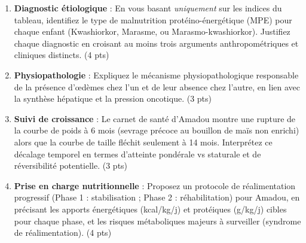 \documentclass[11pt]{article}
\begin{document}
\begin{exercice}
\begin{enumerate}
    \item \textbf{Diagnostic étiologique} : En vous basant \textit{uniquement} sur les indices du tableau, identifiez le type de malnutrition protéino-énergétique (MPE) pour chaque enfant (Kwashiorkor, Marasme, ou Marasmo-kwashiorkor). Justifiez chaque diagnostic en croisant au moins trois arguments anthropométriques et cliniques distincts. \hfill (4 pts)
    \item \textbf{Physiopathologie} : Expliquez le mécanisme physiopathologique responsable de la présence d'œdèmes chez l'un et de leur absence chez l'autre, en lien avec la synthèse hépatique et la pression oncotique. \hfill (3 pts)
    \item \textbf{Suivi de croissance} : Le carnet de santé d'Amadou montre une rupture de la courbe de poids à 6 mois (sevrage précoce au bouillon de maïs non enrichi) alors que la courbe de taille fléchit seulement à 14 mois. Interprétez ce décalage temporel en termes d'atteinte pondérale vs staturale et de réversibilité potentielle. \hfill (3 pts)
    \item \textbf{Prise en charge nutritionnelle} : Proposez un protocole de réalimentation progressif (Phase 1 : stabilisation ; Phase 2 : réhabilitation) pour Amadou, en précisant les apports énergétiques (kcal/kg/j) et protéiques (g/kg/j) cibles pour chaque phase, et les risques métaboliques majeurs à surveiller (syndrome de réalimentation). \hfill (4 pts)
\end{enumerate}
\end{exercice}
\end{document}
